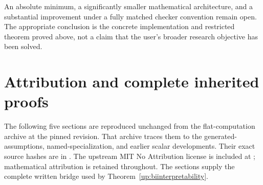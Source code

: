 An absolute minimum, a significantly smaller mathematical architecture,
and a substantial improvement under a fully matched checker convention
remain open. The appropriate conclusion is the concrete implementation
and restricted theorem proved above, not a claim that the user's broader
research objective has been solved.

\appendix
\clearpage
\section*{Attribution and complete inherited proofs}
The following five sections are reproduced unchanged from the
flat-computation archive at the pinned revision. That archive traces them
to the generated-assumptions, named-specialization, and earlier scalar
developments. Their exact source hashes are in
. The upstream MIT No Attribution
license is included at ; mathematical
attribution is retained throughout. The sections supply the complete
written bridge used by Theorem~\ref{up:biinterpretability}.







